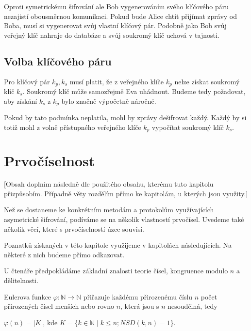 \documentclass[
  program=infoi,
  biblatex,
  figures=false,
  glossaries,
  index
]{kidiplom}
\begin{document}
    Oproti symetrickému šifrování ale Bob vygenerováním svého klíčového páru nezajistí obousměrnou komunikaci.
    Pokud bude Alice chtít přijímat zprávy od Boba, musí si vygenerovat svůj vlastní klíčový pár.
    Podobně jako Bob svůj veřejný klíč nahraje do databáze a svůj soukromý klíč uchová v tajnosti.


    \subsection{Volba klíčového páru}

        Pro klíčový pár $k_p, k_s$ musí platit, že z veřejného klíče $k_p$ nelze získat soukromý klíč $k_s$.
        Soukromý klíč může samozřejmě Eva uhádnout.
        Budeme tedy požadovat, aby získání $k_s$ z $k_p$ bylo značně výpočetně náročné.

        Pokud by tato podmínka neplatila, mohl by zprávy dešifrovat každý.
        Každý by si totiž mohl z volně přístupného veřejného klíče $k_p$ vypočítat soukromý klíč $k_s$.


\section{Prvočíselnost}\label{sec:primality}


    [Obsah doplním následně dle použitého obsahu, kterému tuto kapitolu přizpůsobím.
    Případně věty rozdělím přímo ke kapitolám, u kterých jsou využity.]

    Než se dostaneme ke konkrétním metodám a protokolům využívajících asymetrické šifrování, podíváme se na několik vlastností prvočísel.
    Uvedeme také několik věcí, které s prvočíselností úzce souvisí.

    Poznatků získaných v této kapitole využijeme v kapitolách následujících.
    Na některé z nich budeme přímo odkazovat.

    U čtenáře předpokládáme základní znalosti teorie čísel, kongruence modulo $n$ a dělitelnosti.



    \begin{definition}
        Eulerova funkce $\varphi: \mathbb{N} \rightarrow \mathbb{N}$ přiřazuje každému přirozenému číslu $n$
        počet přirozených čísel menších nebo rovno $n$, která jsou s $n$ nesoudělná, tedy

        \begin{center}
            $\varphi(n) = |K|$, kde $K = \{k \in \mathbb{N} \mid k \leq n; NSD(k,n)=1\}$.
        \end{center}

    \end{definition}
\end{document}
